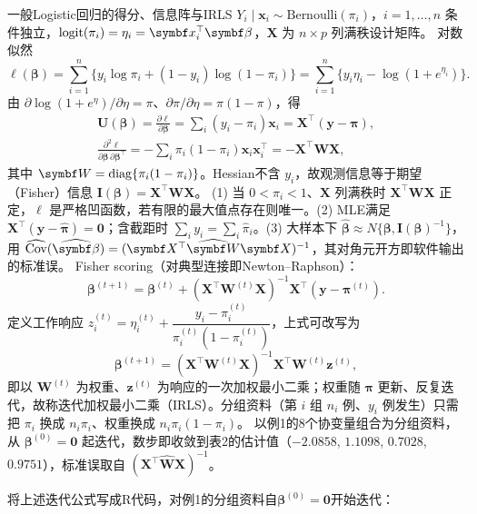 \begin{derivation}{一般Logistic回归的得分、信息阵与IRLS}
$Y_i\mid\bm x_i\sim\text{Bernoulli}(\pi_i)$，$i=1,\ldots,n$ 条件独立，$\logit(\pi_i)=\eta_i=\bm x_i^\top\bm\beta$，$\bm X$ 为 $n\times p$ 列满秩设计矩阵。
对数似然
\[
\ell(\bm\beta)=\sum_{i=1}^n\{y_i\log\pi_i+(1-y_i)\log(1-\pi_i)\}
=\sum_{i=1}^n\{y_i\eta_i-\log(1+e^{\eta_i})\}.
\]
由 $\partial\log(1+e^{\eta})/\partial\eta=\pi$、$\partial\pi/\partial\eta=\pi(1-\pi)$，得
\begin{gather*}
\bm U(\bm\beta)=\frac{\partial\ell}{\partial\bm\beta}=\sum_i(y_i-\pi_i)\bm x_i=\bm X^\top(\bm y-\bm\pi),\\
\frac{\partial^2\ell}{\partial\bm\beta\,\partial\bm\beta^\top}=-\sum_i\pi_i(1-\pi_i)\bm x_i\bm x_i^\top=-\bm X^\top\bm W\bm X,
\end{gather*}
其中 $\bm W=\diag\{\pi_i(1-\pi_i)\}$。Hessian不含 $y_i$，故观测信息等于期望（Fisher）信息 $\bm I(\bm\beta)=\bm X^\top\bm W\bm X$。
(1) 当 $0<\pi_i<1$、$\bm X$ 列满秩时 $\bm X^\top\bm W\bm X$ 正定，$\ell$ 是严格凹函数，若有限的最大值点存在则唯一。(2) MLE满足 $\bm X^\top(\bm y-\widehat{\bm\pi})=\bm 0$；含截距时 $\sum_iy_i=\sum_i\widehat\pi_i$。(3) 大样本下 $\widehat{\bm\beta}\approx N\{\bm\beta,\bm I(\bm\beta)^{-1}\}$，用 $\widehat{\Cov}(\widehat{\bm\beta})=(\bm X^\top\widehat{\bm W}\bm X)^{-1}$，其对角元开方即软件输出的标准误。
Fisher scoring（对典型连接即Newton--Raphson）：
\[
\bm\beta^{(t+1)}=\bm\beta^{(t)}+(\bm X^\top\bm W^{(t)}\bm X)^{-1}\bm X^\top(\bm y-\bm\pi^{(t)}).
\]
定义工作响应 $z_i^{(t)}=\eta_i^{(t)}+\dfrac{y_i-\pi_i^{(t)}}{\pi_i^{(t)}(1-\pi_i^{(t)})}$，上式可改写为
\[
\bm\beta^{(t+1)}=(\bm X^\top\bm W^{(t)}\bm X)^{-1}\bm X^\top\bm W^{(t)}\bm z^{(t)},
\]
即以 $\bm W^{(t)}$ 为权重、$\bm z^{(t)}$ 为响应的一次加权最小二乘；权重随 $\bm\pi$ 更新、反复迭代，故称迭代加权最小二乘（IRLS）。分组资料（第 $i$ 组 $n_i$ 例、$y_i$ 例发生）只需把 $\pi_i$ 换成 $n_i\pi_i$、权重换成 $n_i\pi_i(1-\pi_i)$。
以例1的8个协变量组合为分组资料，从 $\bm\beta^{(0)}=\bm 0$ 起迭代，数步即收敛到表2的估计值（$-2.0858$, $1.1098$, $0.7028$, $0.9751$），标准误取自 $(\bm X^\top\widehat{\bm W}\bm X)^{-1}$。
\end{derivation}
将上述迭代公式写成R代码，对例1的分组资料自$\bm\beta^{(0)}=\bm0$开始迭代：
\par\noindent
{}
